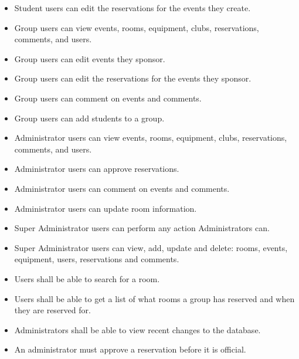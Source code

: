 \documentclass{article}
\begin{document}
\begin{itemize}
\item Student users can edit the reservations for the events they create.
\item Group users can view events, rooms, equipment, clubs, reservations, comments, and users.
\item Group users can edit events they sponsor.
\item Group users can edit the reservations for the events they sponsor.
\item Group users can comment on events and comments.
\item Group users can add students to a group.
\item Administrator users can view events, rooms, equipment, clubs, reservations, comments, and users.
\item Administrator users can approve reservations.
\item Administrator users can comment on events and comments.
\item Administrator users can update room information.
\item Super Administrator users can perform any action Administrators can.
\item Super Administrator users can view, add, update and delete: rooms, events, equipment, users, reservations and comments.
\item Users shall be able to search for a room.
\item Users shall be able to get a list of what rooms a group has
reserved and when they are reserved for.
\item Administrators shall be able to view recent changes to the database.
\item An administrator must approve a reservation before it is official.
\end{itemize}



\end{document}
